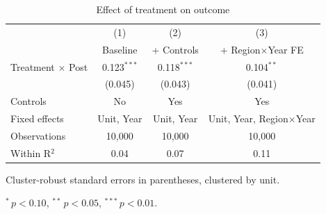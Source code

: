 %

\begin{table}[htbp]\centering
\caption{Effect of treatment on outcome}
\label{tab:main}
\begin{threeparttable}
\begin{tabular}{lccc}
\toprule
                          & (1)        & (2)        & (3) \\
                          & Baseline   & + Controls & + Region$\times$Year FE \\
\midrule
Treatment $\times$ Post   & 0.123$^{***}$ & 0.118$^{***}$ & 0.104$^{**}$ \\
                          & (0.045)       & (0.043)       & (0.041) \\
\midrule
Controls                  & No  & Yes & Yes \\
Fixed effects             & Unit, Year & Unit, Year & Unit, Year, Region$\times$Year \\
Observations              & 10{,}000 & 10{,}000 & 10{,}000 \\
Within R$^2$              & 0.04 & 0.07 & 0.11 \\
\bottomrule
\end{tabular}
\begin{tablenotes}\footnotesize
\item Cluster-robust standard errors in parentheses, clustered by unit.
\item $^{*}\,p<0.10$, $^{**}\,p<0.05$, $^{***}\,p<0.01$.
\end{tablenotes}
\end{threeparttable}
\end{table}
